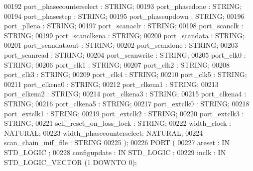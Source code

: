 \begin{DoxyCode}
00192       port\_phasecounterselect : \textcolor{comment}{STRING};
00193       port\_phasedone          : \textcolor{comment}{STRING};
00194       port\_phasestep          : \textcolor{comment}{STRING};
00195       port\_phaseupdown        : \textcolor{comment}{STRING};
00196       port\_pllena             : \textcolor{comment}{STRING};
00197       port\_scanaclr           : \textcolor{comment}{STRING};
00198       port\_scanclk            : \textcolor{comment}{STRING};
00199       port\_scanclkena         : \textcolor{comment}{STRING};
00200       port\_scandata           : \textcolor{comment}{STRING};
00201       port\_scandataout        : \textcolor{comment}{STRING};
00202       port\_scandone           : \textcolor{comment}{STRING};
00203       port\_scanread           : \textcolor{comment}{STRING};
00204       port\_scanwrite          : \textcolor{comment}{STRING};
00205       port\_clk0               : \textcolor{comment}{STRING};
00206       port\_clk1               : \textcolor{comment}{STRING};
00207       port\_clk2               : \textcolor{comment}{STRING};
00208       port\_clk3               : \textcolor{comment}{STRING};
00209       port\_clk4               : \textcolor{comment}{STRING};
00210       port\_clk5               : \textcolor{comment}{STRING};
00211       port\_clkena0            : \textcolor{comment}{STRING};
00212       port\_clkena1            : \textcolor{comment}{STRING};
00213       port\_clkena2            : \textcolor{comment}{STRING};
00214       port\_clkena3            : \textcolor{comment}{STRING};
00215       port\_clkena4            : \textcolor{comment}{STRING};
00216       port\_clkena5            : \textcolor{comment}{STRING};
00217       port\_extclk0            : \textcolor{comment}{STRING};
00218       port\_extclk1            : \textcolor{comment}{STRING};
00219       port\_extclk2            : \textcolor{comment}{STRING};
00220       port\_extclk3            : \textcolor{comment}{STRING};
00221       self\_reset\_on\_loss\_lock : \textcolor{comment}{STRING};
00222       width\_clock             : \textcolor{comment}{NATURAL};
00223       width\_phasecounterselect: \textcolor{comment}{NATURAL};
00224       scan\_chain\_mif\_file     : \textcolor{comment}{STRING}
00225    );
00226 \textcolor{keywordflow}{PORT} (
00227       areset               : \textcolor{keywordflow}{IN} \textcolor{comment}{STD\_LOGIC} ;
00228       configupdate         : \textcolor{keywordflow}{IN} \textcolor{comment}{STD\_LOGIC} ;
00229       inclk                : \textcolor{keywordflow}{IN} \textcolor{comment}{STD\_LOGIC\_VECTOR} (\textcolor{vhdllogic}{}\textcolor{vhdllogic}{1} \textcolor{keywordflow}{DOWNTO} \textcolor{vhdllogic}{}\textcolor{vhdllogic}{0});

\end{DoxyCode}
